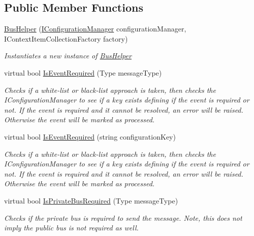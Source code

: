 \subsection*{Public Member Functions}
\begin{DoxyCompactItemize}
\item 
\hyperlink{classCqrs_1_1Bus_1_1BusHelper_aa5efb509877057c06b8843e34a8c4dd2_aa5efb509877057c06b8843e34a8c4dd2}{Bus\+Helper} (\hyperlink{interfaceCqrs_1_1Configuration_1_1IConfigurationManager}{I\+Configuration\+Manager} configuration\+Manager, I\+Context\+Item\+Collection\+Factory factory)
\begin{DoxyCompactList}\small\item\em Instantiates a new instance of \hyperlink{classCqrs_1_1Bus_1_1BusHelper}{Bus\+Helper} \end{DoxyCompactList}\item 
virtual bool \hyperlink{classCqrs_1_1Bus_1_1BusHelper_a28c675e976adbf348637ec6ff6410c1a_a28c675e976adbf348637ec6ff6410c1a}{Is\+Event\+Required} (Type message\+Type)
\begin{DoxyCompactList}\small\item\em Checks if a white-\/list or black-\/list approach is taken, then checks the I\+Configuration\+Manager to see if a key exists defining if the event is required or not. If the event is required and it cannot be resolved, an error will be raised. Otherwise the event will be marked as processed. \end{DoxyCompactList}\item 
virtual bool \hyperlink{classCqrs_1_1Bus_1_1BusHelper_a60a9603d5c6b7f29ee42491475714895_a60a9603d5c6b7f29ee42491475714895}{Is\+Event\+Required} (string configuration\+Key)
\begin{DoxyCompactList}\small\item\em Checks if a white-\/list or black-\/list approach is taken, then checks the I\+Configuration\+Manager to see if a key exists defining if the event is required or not. If the event is required and it cannot be resolved, an error will be raised. Otherwise the event will be marked as processed. \end{DoxyCompactList}\item 
virtual bool \hyperlink{classCqrs_1_1Bus_1_1BusHelper_aec31c15f8f81de5079d52de2bfcbc718_aec31c15f8f81de5079d52de2bfcbc718}{Is\+Private\+Bus\+Required} (Type message\+Type)
\begin{DoxyCompactList}\small\item\em Checks if the private bus is required to send the message. Note, this does not imply the public bus is not required as well. \end{DoxyCompactList}\item 

\end{DoxyCompactItemize}
